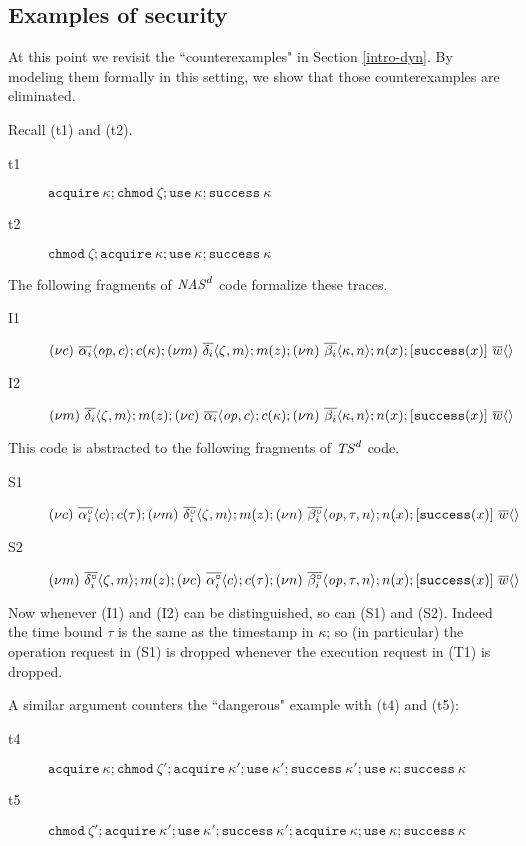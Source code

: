 \documentclass[10pt]{article}
\newcommand{\op}{{\it op}}
\newcommand{\tup}[1]{\langle #1\rangle}
\newcommand{\pause}{;}
\newcommand{\betac}{\beta^\circ}
\newcommand{\alphac}{\alpha^\circ}
\newcommand{\deltac}{\delta^\circ}
\begin{document}
\subsection{Examples of security}
At this point we revisit the ``counterexamples" in Section \ref{intro-dyn}. By modeling them formally in this setting, we show that those counterexamples are eliminated. 

Recall (t1) and (t2).
\begin{description}
\item[t1] $\mathtt{acquire}~\kappa; \mathtt{chmod}~\zeta; \mathtt{use}~\kappa; \mathtt{success}\:\kappa$
\item[t2] $\mathtt{chmod}~\zeta; \mathtt{acquire}~\kappa; \mathtt{use}~\kappa; \mathtt{success}\:\kappa$
\end{description}
The following fragments of ${\it NAS}^d$ code formalize these traces.
\begin{description}
\item[I1] $(\nu c)~\overline{\alpha_i}\tup{\op,c}\pause c(\kappa)\pause (\nu m)~\overline{\delta_i}\tup{\zeta,m}\pause m(z)\pause (\nu n)~\overline{\beta_i}\tup{\kappa,n}\pause n(x)\pause [\mathtt{success}(x)]~\overline w\tup{}$
\item[I2] $(\nu m)~\overline{\delta_i}\tup{\zeta,m}\pause m(z)\pause (\nu c)~\overline{\alpha_i}\tup{\op,c}\pause c(\kappa)\pause (\nu n)~\overline{\beta_i}\tup{\kappa,n}\pause n(x)\pause [\mathtt{success}(x)]~\overline w\tup{}$
\end{description}
This code is abstracted to the following fragments of ${\it TS}^d$ code.
\begin{description}
\item[S1] $(\nu c)~\overline{\alphac_i}\tup{c}\pause c(\tau)\pause (\nu m)~\overline{\deltac_i}\tup{\zeta,m}\pause m(z)\pause (\nu n)~\overline{\betac_i}\tup{\op,\tau,n}\pause n(x)\pause [\mathtt{success}(x)]~\overline w\tup{}$
\item[S2] $(\nu m)~\overline{\deltac_i}\tup{\zeta,m}\pause m(z)\pause (\nu c)~\overline{\alphac_i}\tup{c}\pause c(\tau)\pause (\nu n)~\overline{\betac_i}\tup{\op,\tau,n}\pause n(x)\pause [\mathtt{success}(x)]~\overline w\tup{}$
\end{description}
Now whenever (I1) and (I2) can be distinguished, so can (S1) and (S2). Indeed the time bound $\tau$ is the same as the timestamp in $\kappa$; so (in particular) the operation request in (S1) is dropped whenever the execution request in (T1) is dropped.

A similar argument counters the ``dangerous" example with (t4) and (t5):
\begin{description}
\item[t4] $\mathtt{acquire}~\kappa; \mathtt{chmod}~\zeta'; \mathtt{acquire}~\kappa'; \mathtt{use}~\kappa'; \mathtt{success}\:\kappa'; \mathtt{use}~\kappa; \mathtt{success}\:\kappa$
\item[t5] $\mathtt{chmod}~\zeta'; \mathtt{acquire}~\kappa'; \mathtt{use}~\kappa'; \mathtt{success}\:\kappa'; \mathtt{acquire}~\kappa; \mathtt{use}~\kappa; \mathtt{success}\:\kappa$
\end{description}
\end{document}
